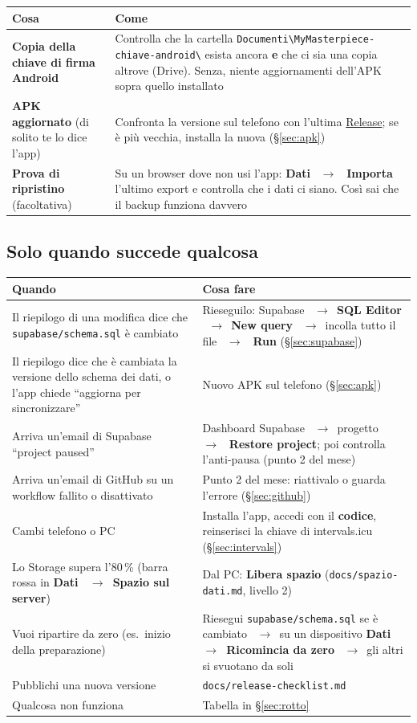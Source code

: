 \documentclass[11pt,a4paper]{article}
\newcommand{\thead}[1]{\textbf{\color{accent}#1}}
\newcommand{\ra}{\unskip\nobreak\ $\rightarrow$\ \ignorespaces}            %
\newcommand{\bt}[1]{\textbf{#1}}               %
\newcommand{\code}[1]{\texttt{#1}}             %
\newcommand{\sezione}[1]{\S\ref{#1}}           %
\newcommand{\repo}{https://github.com/AleCovi04/My-Masterpiece}
\begin{document}
\begin{tabularx}{\textwidth}{L{4.4cm}Y}
  \toprule \thead{Cosa} & \thead{Come} \\ \midrule
  \bt{Copia della chiave di firma Android} & Controlla che la cartella
    \code{Documenti\textbackslash\allowbreak MyMasterpiece-\allowbreak chiave-android\textbackslash} esista ancora \bt{e}
    che ci sia una copia altrove (Drive). Senza, niente aggiornamenti dell'APK sopra quello installato \\
  \bt{APK aggiornato} (di solito te lo dice l'app) & Confronta la versione sul telefono con l'ultima
    \href{\repo/releases/latest}{Release}; se è più vecchia, installa la nuova (\sezione{sec:apk}) \\
  \bt{Prova di ripristino} (facoltativa) & Su un browser dove non usi l'app: \bt{Dati} \ra
    \bt{Importa} l'ultimo export e controlla che i dati ci siano. Così sai che il backup funziona davvero \\
\bottomrule
\end{tabularx}

\subsection*{Solo quando succede qualcosa}

{\small
\begin{tabularx}{\textwidth}{L{6.4cm}Y}
  \toprule \thead{Quando} & \thead{Cosa fare} \\ \midrule
  Il riepilogo di una modifica dice che \code{supabase/schema.sql} è cambiato &
    Rieseguilo: Supabase \ra \bt{SQL Editor} \ra \bt{New query} \ra incolla tutto il file \ra
    \bt{Run} (\sezione{sec:supabase}) \\
  Il riepilogo dice che è cambiata la versione dello schema dei dati, o l'app
    chiede ``aggiorna per sincronizzare'' & Nuovo APK sul telefono (\sezione{sec:apk}) \\
  Arriva un'email di Supabase ``project paused'' & Dashboard Supabase \ra progetto \ra
    \bt{Restore project}; poi controlla l'anti-pausa (punto 2 del mese) \\
  Arriva un'email di GitHub su un workflow fallito o disattivato &
    Punto 2 del mese: riattivalo o guarda l'errore (\sezione{sec:github}) \\
  Cambi telefono o PC & Installa l'app, accedi con il \bt{codice}, reinserisci la chiave di
    intervals.icu (\sezione{sec:intervals}) \\
  Lo Storage supera l'80\,\% (barra rossa in \bt{Dati \ra Spazio sul server}) &
    Dal PC: \bt{Libera spazio} (\code{docs/spazio-dati.md}, livello 2) \\
  Vuoi ripartire da zero (es.\ inizio della preparazione) & Riesegui \code{supabase/schema.sql}
    se è cambiato \ra su un dispositivo \bt{Dati \ra Ricomincia da zero} \ra gli altri si
    svuotano da soli \\
  Pubblichi una nuova versione & \code{docs/release-checklist.md} \\
  Qualcosa non funziona & Tabella in \sezione{sec:rotto} \\
\bottomrule
\end{tabularx}
}
\end{document}
